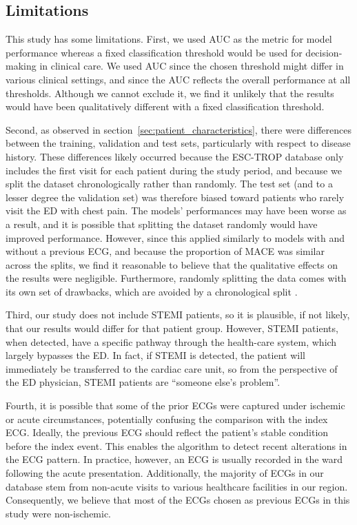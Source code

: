 \documentclass[preprint]{elsarticle}
\begin{document}
\subsection{Limitations}
This study has some limitations. First, we used AUC as the metric for model performance whereas a fixed classification threshold would be used for decision-making in clinical care. We used AUC since the chosen threshold might differ in various clinical settings, and since the AUC reflects the overall performance at all thresholds. Although we cannot exclude it, we find it unlikely that the results would have been qualitatively different with a fixed classification threshold.

Second, as observed in section~\ref{sec:patient_characteristics}, there were differences between the training, validation and test sets, particularly with respect to disease history. These differences likely occurred because the ESC-TROP database only includes the first visit for each patient during the study period, and because we split the dataset chronologically rather than randomly. The test set (and to a lesser degree the validation set) was therefore biased toward patients who rarely visit the ED with chest pain. The models' performances may have been worse as a result, and it is possible that splitting the dataset randomly would have improved performance. However, since this applied similarly to models with and without a previous ECG, and because the proportion of MACE was similar across the splits, we find it reasonable to believe that the qualitative effects on the results were negligible. Furthermore, randomly splitting the data comes with its own set of drawbacks, which are avoided by a chronological split \citep{steyerberg2009}.

Third, our study does not include STEMI patients, so it is plausible, if not likely, that our results would differ for that patient group. However, STEMI patients, when detected, have a specific pathway through the health-care system, which largely bypasses the ED. In fact, if STEMI is detected, the patient will immediately be transferred to the cardiac care unit, so from the perspective of the ED physician, STEMI patients are ``someone else's problem''.

Fourth, it is possible that some of the prior ECGs were captured under ischemic or acute circumstances, potentially confusing the comparison with the index ECG. Ideally, the previous ECG should reflect the patient's stable condition before the index event. This enables the algorithm to detect recent alterations in the ECG pattern. In practice, however, an ECG is usually recorded in the ward following the acute presentation. Additionally, the majority of ECGs in our database stem from non-acute visits to various healthcare facilities in our region. Consequently, we believe that most of the ECGs chosen as previous ECGs in this study were non-ischemic.
\end{document}
